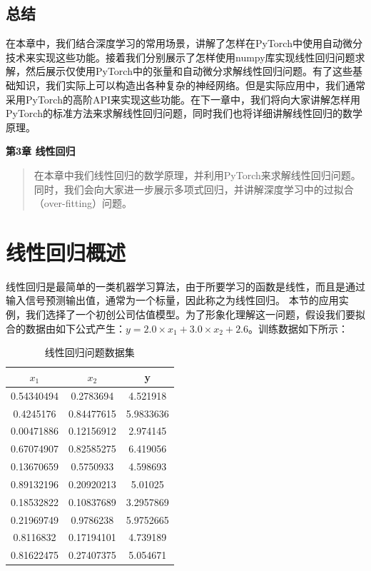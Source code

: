 \documentclass[UTF8]{article}
\begin{document}
\subsection{总结}
在本章中，我们结合深度学习的常用场景，讲解了怎样在PyTorch中使用自动微分技术来实现这些功能。接着我们分别展示了怎样使用numpy库实现线性回归问题求解，然后展示仅使用PyTorch中的张量和自动微分求解线性回归问题。有了这些基础知识，我们实际上可以构造出各种复杂的神经网络。但是实际应用中，我们通常采用PyTorch的高阶API来实现这些功能。在下一章中，我们将向大家讲解怎样用PyTorch的标准方法来求解线性回归问题，同时我们也将详细讲解线性回归的数学原理。

\newpage
\maketitle
\begin{center}
\Large \textbf{第3章 线性回归} \quad \textbf{}
\end{center}
\begin{abstract}
在本章中我们线性回归的数学原理，并利用PyTorch来求解线性回归问题。同时，我们会向大家进一步展示多项式回归，并讲解深度学习中的过拟合（over-fitting）问题。
\end{abstract}
\section{线性回归概述}
线性回归是最简单的一类机器学习算法，由于所要学习的函数是线性，而且是通过输入信号预测输出值，通常为一个标量，因此称之为线性回归。\newline
本节的应用实例，我们选择了一个初创公司估值模型。为了形象化理解这一问题，假设我们要拟合的数据由如下公式产生：$y = 2.0 \times x_{1} + 3.0 \times x_{2} + 2.6$。训练数据如下所示：
\begin{table}[H]
\centering
\caption{线性回归问题数据集}
\label{lrrn-dataset1}
\begin{tabular}{|c|c|c|} \hline
$x_{1}$ & $x_{2}$ & y \\ \hline 
0.54340494 & 0.2783694 & 4.521918 \\ \hline 
0.4245176  & 0.84477615  & 5.9833636 \\ \hline
0.00471886 & 0.12156912 & 2.974145 \\ \hline
0.67074907 & 0.82585275 & 6.419056 \\ \hline
0.13670659 & 0.5750933  & 4.598693 \\ \hline
0.89132196 & 0.20920213 & 5.01025 \\ \hline
0.18532822 & 0.10837689 & 3.2957869 \\ \hline
0.21969749 & 0.9786238 & 5.9752665 \\ \hline
0.8116832  & 0.17194101 & 4.739189 \\ \hline
0.81622475 & 0.27407375 & 5.054671 \\ \hline
\end{tabular}
\end{table}
\end{document}
